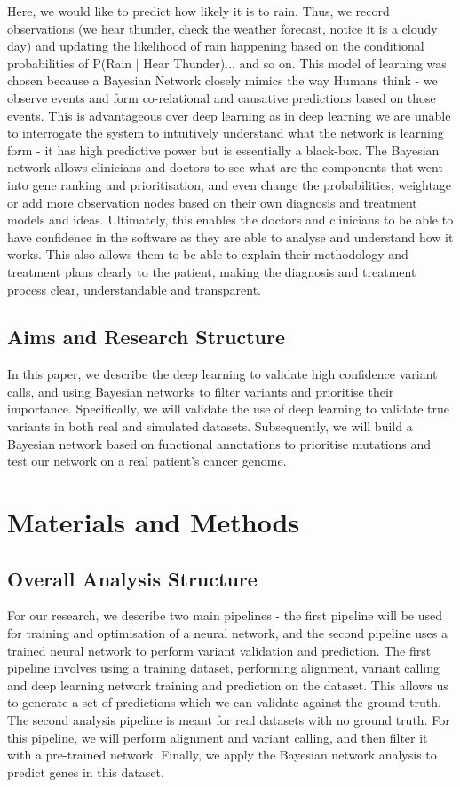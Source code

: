\documentclass{article}
\begin{document}
Here, we would like to predict how likely it is to rain. Thus, we record observations (we hear thunder, check the weather forecast, notice it is a cloudy day) and updating the likelihood of rain happening based on the conditional probabilities of P(Rain | Hear Thunder)... and so on. This model of learning was chosen because a Bayesian Network closely mimics the way Humans think - we observe events and form co-relational and causative predictions based on those events. This is advantageous over deep learning as in deep learning we are unable to interrogate the system to intuitively understand what the network is learning form - it has high predictive power but is essentially a black-box. The Bayesian network allows clinicians and doctors to see what are the components that went into gene ranking and prioritisation, and even change the probabilities, weightage or add more observation nodes based on their own diagnosis and treatment models and ideas. Ultimately, this enables the doctors and clinicians to be able to have confidence in the software as they are able to analyse and understand how it works. This also allows them to be able to explain their methodology and treatment plans clearly to the patient, making the diagnosis and treatment process clear, understandable and transparent.

\subsection{Aims and Research Structure}
In this paper, we describe the deep learning to validate high confidence variant calls, and using Bayesian networks to filter variants and prioritise their importance. Specifically, we will validate the use of deep learning to validate true variants in both real and simulated datasets. Subsequently, we will build a Bayesian network based on functional annotations to prioritise mutations and test our network on a real patient's cancer genome.

\newpage
\section{Materials and Methods}

\subsection{Overall Analysis Structure}
For our research, we describe two main pipelines - the first pipeline will be used for training and optimisation of a neural network, and the second pipeline uses a trained neural network to perform variant validation and prediction. The first pipeline involves using a training  dataset, performing alignment, variant calling and deep learning network training and prediction on the dataset. This allows us to generate a set of predictions which we can validate against the ground truth. The second analysis pipeline is meant for real datasets with no ground truth. For this pipeline, we will perform alignment and variant calling, and then filter it with a pre-trained network. Finally, we apply the Bayesian network analysis to predict genes in this dataset.
\end{document}
